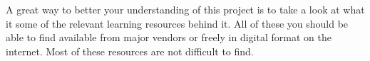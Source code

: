 
A great way to better your understanding of this project is to take a look at what it some of the relevant learning resources behind it. All of these you should be able to find available from major vendors or freely in digital format on the internet. Most of these resources are not difficult to find.






